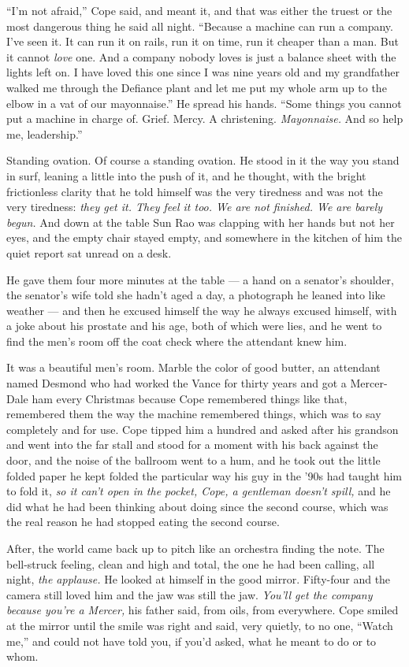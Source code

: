 \documentclass[11pt,openany]{book}
\begin{document}
``I'm not afraid,'' Cope said, and meant it, and that was either the truest or the most dangerous thing he said all night. ``Because a machine can run a company. I've seen it. It can run it on rails, run it on time, run it cheaper than a man. But it cannot \textit{love} one. And a company nobody loves is just a balance sheet with the lights left on. I have loved this one since I was nine years old and my grandfather walked me through the Defiance plant and let me put my whole arm up to the elbow in a vat of our mayonnaise.'' He spread his hands. ``Some things you cannot put a machine in charge of. Grief. Mercy. A christening. \textit{Mayonnaise.} And so help me, leadership.''

Standing ovation. Of course a standing ovation. He stood in it the way you stand in surf, leaning a little into the push of it, and he thought, with the bright frictionless clarity that he told himself was the very tiredness and was not the very tiredness: \textit{they get it. They feel it too. We are not finished. We are barely begun.} And down at the table Sun Rao was clapping with her hands but not her eyes, and the empty chair stayed empty, and somewhere in the kitchen of him the quiet report sat unread on a desk.

He gave them four more minutes at the table --- a hand on a senator's shoulder, the senator's wife told she hadn't aged a day, a photograph he leaned into like weather --- and then he excused himself the way he always excused himself, with a joke about his prostate and his age, both of which were lies, and he went to find the men's room off the coat check where the attendant knew him.

It was a beautiful men's room. Marble the color of good butter, an attendant named Desmond who had worked the Vance for thirty years and got a Mercer-Dale ham every Christmas because Cope remembered things like that, remembered them the way the machine remembered things, which was to say completely and for use. Cope tipped him a hundred and asked after his grandson and went into the far stall and stood for a moment with his back against the door, and the noise of the ballroom went to a hum, and he took out the little folded paper he kept folded the particular way his guy in the '90s had taught him to fold it, \textit{so it can't open in the pocket, Cope, a gentleman doesn't spill,} and he did what he had been thinking about doing since the second course, which was the real reason he had stopped eating the second course.

After, the world came back up to pitch like an orchestra finding the note. The bell-struck feeling, clean and high and total, the one he had been calling, all night, \textit{the applause.} He looked at himself in the good mirror. Fifty-four and the camera still loved him and the jaw was still the jaw. \textit{You'll get the company because you're a Mercer,} his father said, from oils, from everywhere. Cope smiled at the mirror until the smile was right and said, very quietly, to no one, ``Watch me,'' and could not have told you, if you'd asked, what he meant to do or to whom.
\end{document}
